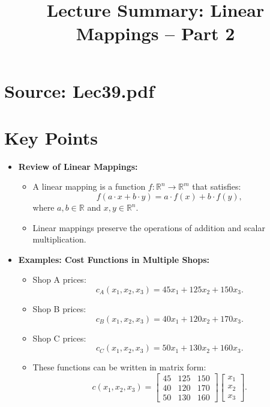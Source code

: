 \documentclass{article}
\title{Lecture Summary: Linear Mappings – Part 2}
\author{}
\date{}
\begin{document}
\maketitle

\section*{Source: Lec39.pdf}

\section*{Key Points}

\begin{itemize}
  \item \textbf{Review of Linear Mappings:}
    \begin{itemize}
      \item A linear mapping is a function $f: \mathbb{R}^n \to \mathbb{R}^m$ that satisfies:
        \[
          f(a \cdot x + b \cdot y) = a \cdot f(x) + b \cdot f(y),
        \]
        where $a, b \in \mathbb{R}$ and $x, y \in \mathbb{R}^n$.
      \item Linear mappings preserve the operations of addition and scalar multiplication.
    \end{itemize}

  \item \textbf{Examples: Cost Functions in Multiple Shops:}
    \begin{itemize}
      \item Shop A prices:
        \[
          c_A(x_1, x_2, x_3) = 45x_1 + 125x_2 + 150x_3.
        \]
      \item Shop B prices:
        \[
          c_B(x_1, x_2, x_3) = 40x_1 + 120x_2 + 170x_3.
        \]
      \item Shop C prices:
        \[
          c_C(x_1, x_2, x_3) = 50x_1 + 130x_2 + 160x_3.
        \]
      \item These functions can be written in matrix form:
        \[
          c(x_1, x_2, x_3) =
          \begin{bmatrix}
            45 & 125 & 150 \\
            40 & 120 & 170 \\
            50 & 130 & 160
          \end{bmatrix}
          \begin{bmatrix}
            x_1 \\ x_2 \\ x_3
          \end{bmatrix}.
        \]
    \end{itemize}


\end{itemize}
\end{document}
